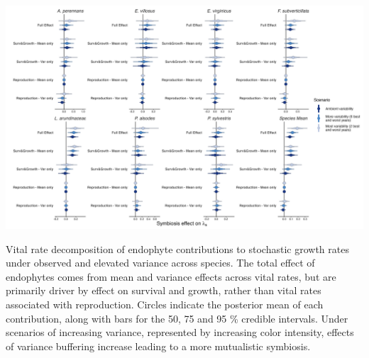 \documentclass[lineno, sn-basic]{sn-jnl}%
\providecommand{\DIFaddbegin}{} %
\providecommand{\DIFaddend}{} %
\providecommand{\DIFdelbegin}{} %
\providecommand{\DIFdelend}{} %
\providecommand{\DIFaddbeginFL}{} %
\providecommand{\DIFaddendFL}{} %
\providecommand{\DIFdelbeginFL}{} %
\providecommand{\DIFdelendFL}{} %
\newcommand{\DIFscaledelfig}{0.5}
\newlength{\DIFdelgraphicswidth} %
\newlength{\DIFdelgraphicsheight} %
\newcommand{\DIFaddincludegraphics}[2][]{{\color{blue}\fbox{\DIFOincludegraphics[#1]{#2}}}} %
\newcommand{\DIFdelincludegraphics}[2][]{%
\sbox{\DIFdelgraphicsbox}{\DIFOincludegraphics[#1]{#2}}%
\settoboxwidth{\DIFdelgraphicswidth}{\DIFdelgraphicsbox} %
\settoboxtotalheight{\DIFdelgraphicsheight}{\DIFdelgraphicsbox} %
\scalebox{\DIFscaledelfig}{%
\parbox[b]{\DIFdelgraphicswidth}{\usebox{\DIFdelgraphicsbox}\\[-\baselineskip] \rule{\DIFdelgraphicswidth}{0em}}\llap{\resizebox{\DIFdelgraphicswidth}{\DIFdelgraphicsheight}{%
\setlength{\unitlength}{\DIFdelgraphicswidth}%
\begin{picture}(1,1)%
\thicklines\linethickness{2pt} %
{\color[rgb]{1,0,0}\put(0,0){\framebox(1,1){}}}%
{\color[rgb]{1,0,0}\put(0,0){\line( 1,1){1}}}%
{\color[rgb]{1,0,0}\put(0,1){\line(1,-1){1}}}%
\end{picture}%
}\hspace*{3pt}}} %
} %
\DeclareRobustCommand{\DIFaddbegin}{\DIFOaddbegin \let\includegraphics\DIFaddincludegraphics} %
\DeclareRobustCommand{\DIFaddend}{\DIFOaddend \let\includegraphics\DIFOincludegraphics} %
\DeclareRobustCommand{\DIFdelbegin}{\DIFOdelbegin \let\includegraphics\DIFdelincludegraphics} %
\DeclareRobustCommand{\DIFdelend}{\DIFOaddend \let\includegraphics\DIFOincludegraphics} %
\DeclareRobustCommand{\DIFaddbeginFL}{\DIFOaddbeginFL \let\includegraphics\DIFaddincludegraphics} %
\DeclareRobustCommand{\DIFaddendFL}{\DIFOaddendFL \let\includegraphics\DIFOincludegraphics} %
\DeclareRobustCommand{\DIFdelbeginFL}{\DIFOdelbeginFL \let\includegraphics\DIFdelincludegraphics} %
\DeclareRobustCommand{\DIFdelendFL}{\DIFOaddendFL \let\includegraphics\DIFOincludegraphics} %
\begin{document}
\DIFdelbegin %
\DIFdelendFL \DIFaddbeginFL \begin{myfigure}[H]
	\DIFaddendFL \centering
	\includegraphics[width=\linewidth]{VRdecomp_contributions_obs_plot.png}
	\DIFdelbeginFL %
\DIFdelendFL \DIFaddbeginFL \caption[Vital rate decomposition of endophyte contributions to stochastic growth rates under observed and elevated variance across species]{\DIFaddendFL Vital rate decomposition of endophyte contributions to stochastic growth rates under observed and elevated variance across species. The total effect of endophytes comes from mean and variance effects across vital rates, but are primarily driver by effect on survival and growth, rather than vital rates associated with reproduction. Circles indicate the posterior mean of each contribution, along with bars for the 50, 75 and 95 \% credible intervals.  Under scenarios of increasing variance, represented by increasing color intensity, effects of variance buffering increase leading to a more mutualistic symbiosis.}
\DIFdelbeginFL %
\DIFdelend \DIFaddbegin \end{myfigure}
\DIFaddend 
\end{document}
